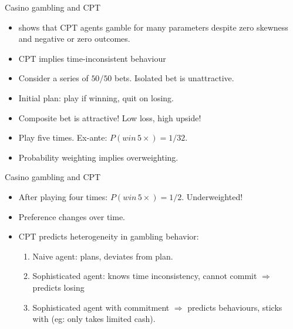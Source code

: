 \documentclass[11pt, aspectratio=169]{beamer}
\begin{document}
\begin{frame}{Casino gambling and CPT}
    \begin{itemize}
        \item \citet{Barberis2012a} shows that CPT agents gamble for many parameters despite zero skewness and negative or zero outcomes.\bigskip
        \item CPT implies time-inconsistent behaviour\bigskip
        \item Consider a series of $50/50$ bets. Isolated bet is unattractive.\bigskip
        \item Initial plan: play if winning, quit on losing.\bigskip
        \item Composite bet is attractive! Low loss, high upside!\bigskip
        \item Play five times. Ex-ante: $P(win\, 5 \times) = 1/32$.\bigskip
        \item Probability weighting implies overweighting.\bigskip
    \end{itemize}
\end{frame}

\begin{frame}{Casino gambling and CPT}
    \begin{itemize}
        \item After playing four times: $P(win\, 5 \times) = 1/2$. Underweighted!\bigskip
        \item Preference changes over time.\bigskip
        \item CPT predicts heterogeneity in gambling behavior:\bigskip
        \begin{enumerate}
            \item Naive agent: plans, deviates from plan.\medskip
            \item Sophisticated agent: knows time inconsistency, cannot commit
            $\Rightarrow$ predicts losing\medskip
            \item Sophisticated agent with commitment $\Rightarrow$ predicts behaviours, sticks with (eg: only takes limited cash).\medskip
        \end{enumerate}
    \end{itemize}
\end{frame}
\end{document}
